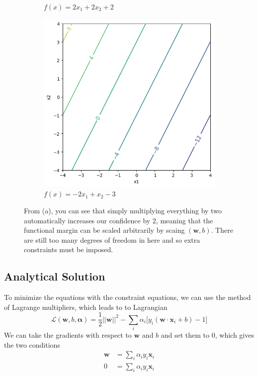 \begin{figure}[H]
\begin{subfigure}[b]{0.32\textwidth}
      \caption{$f(x) = 2 x_1 + 2 x_2 + 2$} 
      \label{fig:two_times_scaled}
    \end{subfigure} 
    \hfill
    \begin{subfigure}[b]{0.32\textwidth} 
      \centering 
      \includegraphics[width=\textwidth]{img/scaling3.png} 
      \caption{$f(x) = -2x_1 + x_2 - 3$} 
      \label{fig:something_else}
    \end{subfigure} 
    \caption{From (a), you can see that simply multiplying everything by two automatically increases our confidence by $2$, meaning that the functional margin can be scaled arbitrarily by scaing $(\mathbf{w}, b)$. There are still too many degrees of freedom in here and so extra constraints must be imposed. } 
    \label{fig:scaling_problem} 
  \end{figure}

\subsection{Analytical Solution} 

  To minimize the equations with the constraint equations, we can use the method of Lagrange multipliers, which leads to to Lagrangian 
  \[\mathcal{L}(\mathbf{w}, b, \boldsymbol{\alpha}) = \frac{1}{2} ||\mathbf{w}||^2 - \sum_i \alpha_i \big[ y_i (\mathbf{w} \cdot \mathbf{x}_i + b) - 1\big]\]
  We can take the gradients with respect to $\mathbf{w}$ and $b$ and set them to $0$, which gives the two conditions 
  \begin{align*} 
    \mathbf{w} & = \sum_i \alpha_i y_i \mathbf{x}_i \\
    0 & = \sum_i \alpha_i y_i \mathbf{x}_i 
  \end{align*}


